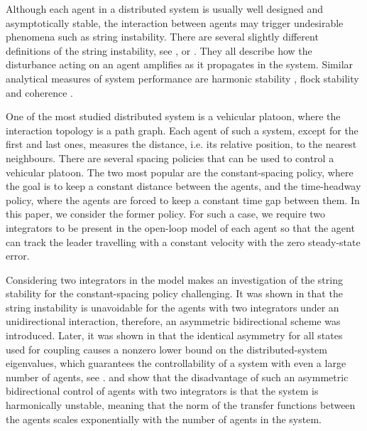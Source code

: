\documentclass[10pt,twocolumn,twoside]{IEEEtran}
\theoremstyle{definition}
\begin{document}
Although each agent in a distributed system is usually well designed and asymptotically stable, the interaction between agents may trigger undesirable phenomena such as string instability. There are several slightly different definitions of the string instability, see \cite{Eyre1998a}, \cite{Ploeg2014} or \cite{Swaroop1996}. They all describe how the disturbance acting on an agent amplifies as it propagates in the system. Similar analytical measures of system performance are harmonic stability \cite{Tangerman2012}, flock stability \cite{Cantos2013} and coherence \cite{Bamieh2012b}.

One of the most studied distributed system is a vehicular platoon, where the interaction topology is a path graph. Each agent of such a system, except for the first and last ones, measures the distance, i.e. its relative position, to the nearest neighbours. There are several spacing policies that can be used to control a vehicular platoon. The two most popular are the constant-spacing policy, where the goal is to keep a constant distance between the agents, and the time-headway policy, where the agents are forced to keep a constant time gap between them. In this paper, we consider the former policy. For such a case, we require two integrators to be present in the open-loop model of each agent so that the agent can track the leader travelling with a constant velocity with the zero steady-state error.

Considering two integrators in the model makes an investigation of the string stability for the constant-spacing policy challenging. It was shown in \cite{Seiler2004a} that the string instability is unavoidable for the agents with two integrators under an unidirectional interaction, therefore, an asymmetric bidirectional scheme was introduced. Later, it was shown in \cite{Hao2011} that the identical asymmetry for all states used for coupling causes a nonzero lower bound on the distributed-system eigenvalues, which guarantees the controllability of a system with even a large number of agents, see \cite{Barooah2009}. \cite{Tangerman2012} and \cite{Herman2014c} show that the disadvantage of such an asymmetric bidirectional control of agents with two integrators is that the system is harmonically unstable, meaning that the  norm of the transfer functions between the agents scales exponentially with the number of agents in the system.
\end{document}
